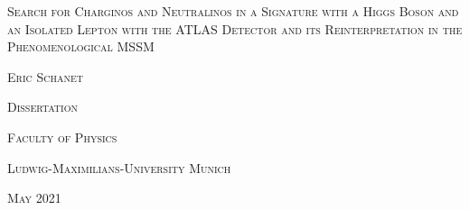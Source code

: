 \documentclass[12pt, oneside]{book}
\begin{document}
 
\thispagestyle{empty}
\begin{center}
\begin{minipage}{1\textwidth}
\centering
    {\fontsize{19}{24}\selectfont\textsc{Search for Charginos and Neutralinos in a Signature with a Higgs Boson and an Isolated Lepton with the ATLAS Detector and its Reinterpretation in the Phenomenological MSSM}\par}
    \vspace{3.5cm}
    {\fontsize{17}{21}\selectfont \textsc{Eric Schanet}\par}
    \vspace{5.5cm}
    {\fontsize{17}{21}\selectfont \textsc{Dissertation}\par}
    \vspace{1.2cm}
    {\fontsize{17}{23}\selectfont\textsc{Faculty of Physics}\par}
    {\fontsize{17}{23}\selectfont\textsc{Ludwig-Maximilians-University Munich}\par}
    \vspace{4.3cm}
    {\centering\Large \textsc{May} 2021\par}
\end{minipage}
\end{center}
\clearpage
 
\end{document}

